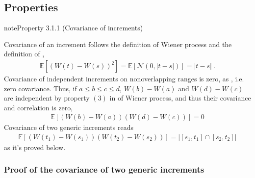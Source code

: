\documentclass[letterpaper,10pt,english]{jupyterBook}
\begin{document}
\subsection{Properties}
\label{\detokenize{ch/prob/wiener:properties}}\label{ch/prob/wiener:property-1}
\begin{sphinxadmonition}{note}{Property 3.1.1 (Covariance of increments)}



\sphinxAtStartPar
Covariance of an increment follows the definition of Wiener process and the definition of {\hyperref[\detokenize{ch/prob/rv-continuous:prob-rv-continuous-ex-normal}]{}},
\begin{equation}\label{equation:ch/prob/wiener:eq:wiener:cov:1}
\begin{split}\mathbb{E}\left[ \left( W(t) - W(s) \right)^2  \right] = \mathbb{E}\left[ \mathscr{N}(0, |t-s|) \right] =  |t - s| \ .\end{split}
\end{equation}
\sphinxAtStartPar
Covariance of independent increments \sphinxhyphen{} on non\sphinxhyphen{}overlapping ranges \sphinxhyphen{} is zero, as {\hyperref[\detokenize{ch/prob/rv-multi-dimensional:prob-multidim-independence-no-correlation}]{}}, i.e. zero covariance. Thus, if \(a \le b \le c \le d\), \(W(b)-W(a)\) and \(W(d)-W(c)\) are independent by property \((3)\) in {\hyperref[\detokenize{ch/prob/wiener:wiener:def}]{}} of Wiener process, and thus their covariance \sphinxhyphen{} and correlation \sphinxhyphen{} is zero,
\begin{equation}\label{equation:ch/prob/wiener:eq:wiener:cov:2}
\begin{split}\mathbb{E}\left[ ( W(b) - W(a) ) ( W(d) - W(c) )  \right] = 0\end{split}
\end{equation}
\sphinxAtStartPar
Covariance of two generic increments reads
\begin{equation}\label{equation:ch/prob/wiener:eq:wiener:cov:3}
\begin{split}\mathbb{E}\left[ \left( W(t_1) - W(s_1) \right)  \left( W(t_2) - W(s_2) \right) \right] = \big| [s_1, t_1] \cap [s_2, t_2]\big|\end{split}
\end{equation}
\sphinxAtStartPar
as it’s proved below.
\end{sphinxadmonition}
\subsubsection*{Proof of the covariance of two generic increments }
\end{document}
